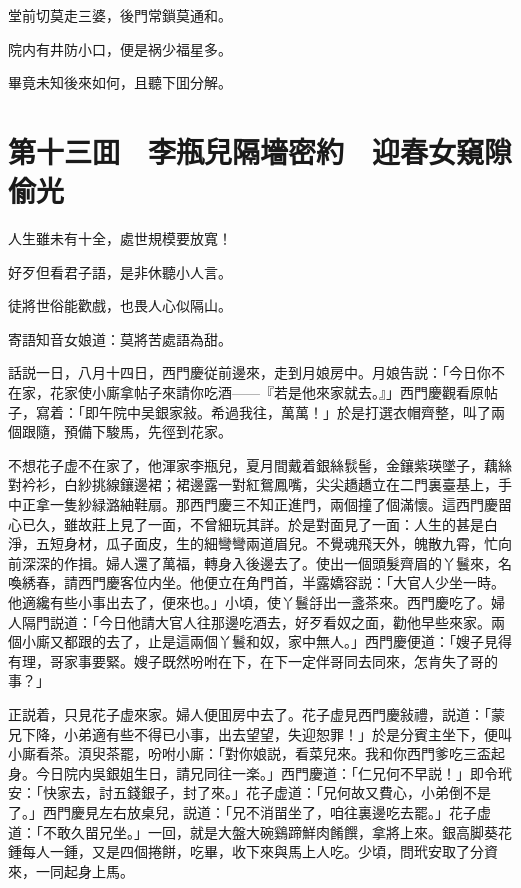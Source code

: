 堂前切莫走三婆，後門常鎖莫通和。

院内有井防小口，便是祸少福星多。

畢竟未知後來如何，且聽下囬分解。

\chapter*{第十三囬　李瓶兒隔墻密約　迎春女窺隙偷光}

人生雖未有十全，處世規模要放寬！

好歹但看君子語，是非休聽小人言。

徒將世俗能歡戲，也畏人心似隔山。

寄語知音女娘道：莫將苦處語為甜。

話説一日，八月十四日，西門慶従前邊來，走到月娘房中。月娘告説：「今日你不在家，花家使小廝拿帖子來請你吃酒——『若是他來家就去。』」西門慶觀看原帖子，寫着：「即午院中吴銀家敍。希過我往，萬萬！」於是打選衣帽齊整，叫了兩個跟隨，預備下駿馬，先徑到花家。

不想花子虚不在家了，他渾家李瓶兒，夏月間戴着銀絲䯼髻，金鑲紫瑛墜子，藕絲對衿衫，白紗挑線鑲邊裙；裙邊露一對紅鴛鳳嘴，尖尖趫趫立在二門裏臺基上，手中正拿一隻紗緑潞紬鞋扇。那西門慶三不知正進門，兩個撞了個滿懷。這西門慶㽞心已久，雖故莊上見了一面，不曾細玩其詳。於是對面見了一面：人生的甚是白淨，五短身材，瓜子面皮，生的細彎彎兩道眉兒。不覺魂飛天外，魄散九霄，忙向前深深的作揖。婦人還了萬福，轉身入後邊去了。使出一個頭髮齊眉的丫鬟來，名喚綉春，請西門慶客位内坐。他便立在角門首，半露嬌容説：「大官人少坐一時。他適纔有些小事出去了，便來也。」小頃，使丫鬟㧱出一盞茶來。西門慶吃了。婦人隔門説道：「今日他請大官人往那邊吃酒去，好歹看奴之面，勸他早些來家。兩個小廝又都跟的去了，止是這兩個丫鬟和奴，家中無人。」西門慶便道：「嫂子見得有理，哥家事要緊。嫂子既然吩咐在下，在下一定伴哥同去同來，怎肯失了哥的事？」

正説着，只見花子虚來家。婦人便囬房中去了。花子虚見西門慶敍禮，説道：「蒙兄下降，小弟適有些不得已小事，出去望望，失迎恕罪！」於是分賓主坐下，便叫小廝看茶。湏臾茶罷，吩咐小廝：「對你娘説，看菜兒來。我和你西門爹吃三盃起身。今日院内吳銀姐生日，請兄同往一楽。」西門慶道：「仁兄何不早説！」即令玳安：「快家去，討五錢銀子，封了來。」花子虚道：「兄何故又費心，小弟倒不是了。」西門慶見左右放桌兒，説道：「兄不消㽞坐了，咱往裏邊吃去罷。」花子虚道：「不敢久㽞兄坐。」一回，就是大盤大碗鷄蹄鮮肉餚饌，拿將上來。銀高脚葵花鍾每人一鍾，又是四個捲餅，吃畢，收下來與馬上人吃。少頃，問玳安取了分資來，一同起身上馬。

